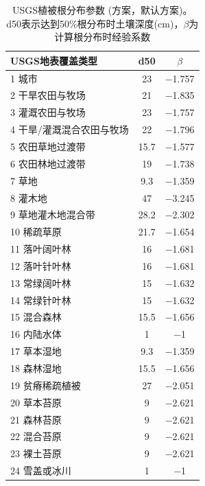 \begin{table}[htbp]
    \centering
    \caption[USGS植被根分布参数(\citet{schenk2002rooting}方案)]{USGS植被根分布参数 (\citet{schenk2002rooting}方案，默认方案)。d50表示达到50\%根分布时土壤深度(cm)，$\beta$为计算根分布时经验系数}
    \label{tab:USGSSchenkANDJackson2002方案默认方案}
    \begin{tabular}{@{}lcc@{}}
    \toprule
    USGS地表覆盖类型     & d50  & $\beta$ \\ \midrule
    1 城市           & 23   & \num{ -1.757  }\\
    2 干旱农田与牧场      & 21   & \num{ -1.835  }\\
    3 灌溉农田与牧场      & 23   & \num{ -1.757  }\\
    4 干旱/灌溉混合农田与牧场 & 22   & \num{ -1.796  }\\
    5 农田草地过渡带      & 15.7 & \num{ -1.577  }\\
    6 农田林地过渡带      & 19   & \num{ -1.738  }\\
    7 草地           & 9.3  & \num{ -1.359  }\\
    8 灌木地          & 47   & \num{ -3.245  }\\
    9 草地灌木地混合带     & 28.2 & \num{ -2.302  }\\
    10 稀疏草原        & 21.7 & \num{ -1.654  }\\
    11 落叶阔叶林       & 16   & \num{ -1.681  }\\
    12 落叶针叶林       & 16   & \num{ -1.681  }\\
    13 常绿阔叶林       & 15   & \num{ -1.632  }\\
    14 常绿针叶林       & 15   & \num{ -1.632  }\\
    15 混合森林        & 15.5 & \num{ -1.656  }\\
    16 内陆水体        & 1    & \num{ -1      }\\
    17 草本湿地        & 9.3  & \num{ -1.359  }\\
    18 森林湿地        & 15.5 & \num{ -1.656  }\\
    19 贫瘠稀疏植被      & 27   & \num{ -2.051  }\\
    20 草本苔原        & 9    & \num{ -2.621  }\\
    21 森林苔原        & 9    & \num{ -2.621  }\\
    22 混合苔原        & 9    & \num{ -2.621  }\\
    23 裸土苔原        & 9    & \num{ -2.621  }\\
    24 雪盖或冰川       & 1    & \num{ -1      }\\ \bottomrule
\end{tabular}
\end{table}


